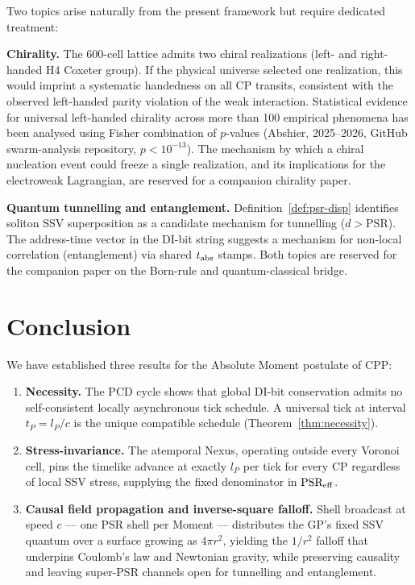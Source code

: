 \documentclass[12pt]{article}
\begin{document}
Two topics arise naturally from the present framework but require dedicated
treatment:

\textbf{Chirality.}  The 600-cell lattice admits two chiral realizations
(left- and right-handed H4 Coxeter group).  If the physical universe selected
one realization, this would imprint a systematic handedness on all CP
transits, consistent with the observed left-handed parity violation of the
weak interaction.  Statistical evidence for universal left-handed chirality
across more than 100 empirical phenomena has been analysed using Fisher
combination of $p$-values (Abshier, 2025--2026, GitHub swarm-analysis
repository, $p < 10^{-13}$).  The mechanism by which a chiral nucleation
event could freeze a single realization, and its implications for the
electroweak Lagrangian, are reserved for a companion chirality paper.

\textbf{Quantum tunnelling and entanglement.}  Definition~\ref{def:psr-disp}
identifies soliton SSV superposition as a candidate mechanism for tunnelling
($d > \text{PSR}$).  The address-time vector in the DI-bit string suggests a
mechanism for non-local correlation (entanglement) via shared $t_{\rm abs}$
stamps.  Both topics are reserved for the companion paper on the Born-rule
and quantum-classical bridge.

\section{Conclusion}
\label{sec:conclusion}

We have established three results for the Absolute Moment postulate of CPP:

\begin{enumerate}
  \item \textbf{Necessity.}  The PCD cycle shows that global DI-bit
    conservation admits no self-consistent locally asynchronous tick
    schedule.  A universal tick at interval $t_P = l_P/c$ is the unique
    compatible schedule (Theorem~\ref{thm:necessity}).

  \item \textbf{Stress-invariance.}  The atemporal Nexus, operating outside
    every Voronoi cell, pins the timelike advance at exactly $l_P$ per tick
    for every CP regardless of local SSV stress, supplying the fixed
    denominator in $\text{PSR}_{\rm eff}$.

  \item \textbf{Causal field propagation and inverse-square falloff.}  Shell
    broadcast at speed $c$ --- one PSR shell per Moment --- distributes the
    GP's fixed SSV quantum over a surface growing as $4\pi r^2$, yielding the
    $1/r^2$ falloff that underpins Coulomb's law and Newtonian gravity,
    while preserving causality and leaving super-PSR channels open for
    tunnelling and entanglement.
\end{enumerate}
\end{document}
